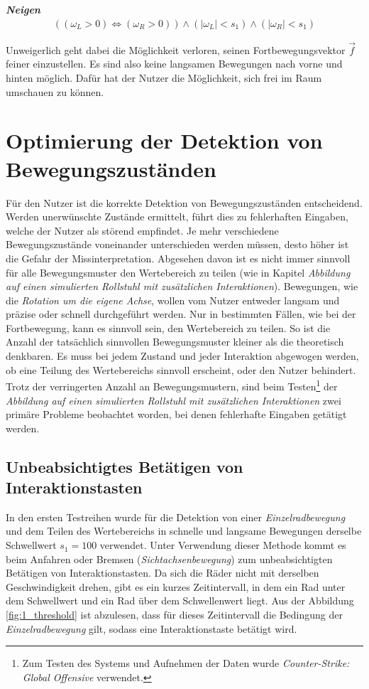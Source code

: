 \textbf{\textit{Neigen}}
\begin{align}
    ((\omega_L > 0) \Leftrightarrow (\omega_R > 0))  \land (|\omega_L| < s_1) \land (|\omega_R| < s_1)
\end{align}

Unweigerlich geht dabei die Möglichkeit verloren, seinen Fortbewegungsvektor $\vec{f}$ feiner einzustellen.
Es sind also keine langsamen Bewegungen nach vorne und hinten möglich.
Dafür hat der Nutzer die Möglichkeit, sich frei im Raum umschauen zu können.

\section{Optimierung der Detektion von Bewegungszuständen}
Für den Nutzer ist die korrekte Detektion von Bewegungszuständen entscheidend.
Werden unerwünschte Zustände ermittelt, führt dies zu fehlerhaften Eingaben, welche der Nutzer als störend empfindet.
Je mehr verschiedene Bewegungszustände voneinander unterschieden werden müssen, desto höher ist die Gefahr der Missinterpretation.
Abgesehen davon ist es nicht immer sinnvoll für alle Bewegungsmuster den Wertebereich zu teilen (wie in Kapitel \textit{Abbildung auf einen simulierten Rollstuhl mit zusätzlichen Interaktionen}).
Bewegungen, wie die \textit{Rotation um die eigene Achse}, wollen vom Nutzer entweder langsam und präzise oder schnell durchgeführt werden.
Nur in bestimmten Fällen, wie bei der Fortbewegung, kann es sinnvoll sein, den Wertebereich zu teilen.
So ist die Anzahl der tatsächlich sinnvollen Bewegungsmuster kleiner als die theoretisch denkbaren.
Es muss bei jedem Zustand und jeder Interaktion abgewogen werden, ob eine Teilung des Wertebereichs sinnvoll erscheint, oder den Nutzer behindert.
Trotz der verringerten Anzahl an Bewegungsmustern, sind beim Testen\footnote{Zum Testen des Systems und Aufnehmen der Daten wurde \textit{Counter-Strike: Global Offensive} verwendet.} der \textit{Abbildung auf einen simulierten Rollstuhl mit zusätzlichen Interaktionen} zwei primäre Probleme beobachtet worden, bei denen fehlerhafte Eingaben getätigt werden.

\subsection{Unbeabsichtigtes Betätigen von Interaktionstasten}
In den ersten Testreihen wurde für die Detektion von einer \textit{Einzelradbewegung} und dem Teilen des Wertebereichs in schnelle und langsame Bewegungen derselbe Schwellwert $s_1 = 100$ verwendet.
Unter Verwendung dieser Methode kommt es beim Anfahren oder Bremsen (\textit{Sichtachsenbewegung}) zum unbeabsichtigten Betätigen von Interaktionstasten.
Da sich die Räder nicht mit derselben Geschwindigkeit drehen, gibt es ein kurzes Zeitintervall, in dem ein Rad unter dem Schwellwert und ein Rad über dem Schwellenwert liegt.
Aus der Abbildung \ref{fig:1_threshold} ist abzulesen, dass für dieses Zeitintervall die Bedingung der \textit{Einzelradbewegung} gilt, sodass eine Interaktionstaste betätigt wird.

